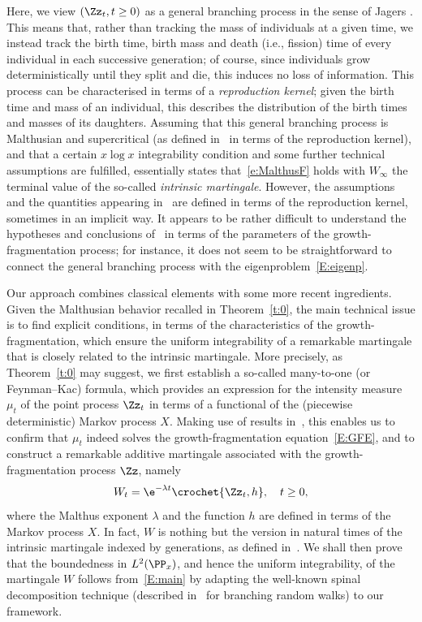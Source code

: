 Here, we view $(\Zz_t, t\ge 0)$ as a general branching process in the sense of Jagers \cite{Jagers}. This means that, rather than tracking the mass of individuals at a given time, we instead track the birth time, birth mass and death (i.e., fission) time of every individual in each successive generation; of course, since individuals grow deterministically until they split and die, this induces no loss of information. This process can be characterised in terms of a \emph{reproduction kernel}; given the birth time and mass of an individual, this describes the distribution of the birth times and masses of its daughters. Assuming that this general branching process is Malthusian and supercritical (as defined in~\cite[Section~5]{Jagers} in terms of the reproduction kernel), and that a certain $x\log x$ integrability condition and some further technical assumptions are fulfilled, \cite[Theorem~7.3]{Jagers} essentially states that~\eqref{e:MalthusF} holds with $W_{\infty}$ the terminal value of the so-called \emph{intrinsic martingale}. However, the assumptions and the quantities appearing in~\cite[Theorem~7.3]{Jagers} are defined in terms of the reproduction kernel, sometimes in an implicit way. It appears to be rather difficult to understand the hypotheses and conclusions of~\cite{Jagers} in terms of the parameters of the growth-fragmentation process; for instance, it does not seem to be straightforward to connect the general branching process with the eigenproblem~\eqref{E:eigenp}.



Our approach combines classical elements with some more recent ingredients. Given the Malthusian behavior recalled in Theorem~\ref{t:0}, the main technical issue is to find explicit conditions, in terms of the characteristics of the growth-fragmentation, which ensure the uniform integrability of a remarkable martingale that is closely related to the intrinsic martingale. More precisely, as Theorem~\ref{t:0} may suggest, we first establish a so-called many-to-one (or Feynman--Kac) formula, which provides an expression for the intensity measure $\mu_t$ of the point process $\Zz_t$ in terms of a functional of the (piecewise deterministic) Markov process $X$. Making use of results in~\cite{BW}, this enables us to confirm that $\mu_t$ indeed solves the growth-fragmentation equation~\eqref{E:GFE}, and to construct a remarkable additive martingale associated with the growth-fragmentation process $\Zz$, namely
\[
W_t=\e^{-\lambda t} \crochet{\Zz_t, h},\quad t\geq 0,
\]
where the Malthus exponent $\lambda$ and the function $h$ are defined in terms of the Markov process $X$. In fact, $W$ is nothing but the version in natural times of the intrinsic martingale indexed by generations, as defined in~\cite[Section~5]{Jagers}. We shall then prove that the boundedness in $L^2(\PP_x)$, and hence the uniform integrability, of the martingale $W$ follows from~\eqref{E:main} by adapting the well-known spinal decomposition technique (described in~\cite{BigKyp} for branching random walks) to our framework.

